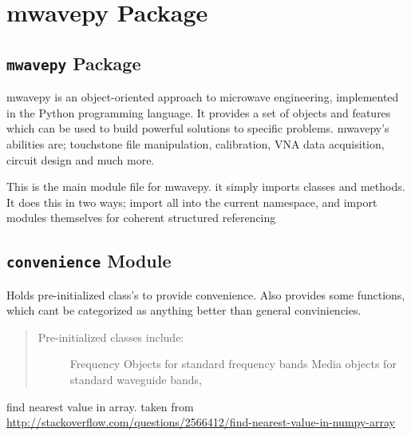 \documentclass[letterpaper,10pt,english]{sphinxmanual}
\begin{document}
\section{mwavepy Package}
\label{api/mwavepy:mwavepy-package}\label{api/mwavepy::doc}

\subsection{\texttt{mwavepy} Package}
\label{api/mwavepy:id1}\label{api/mwavepy:module-mwavepy.__init__}
mwavepy is an object-oriented approach to microwave engineering, 
implemented in the Python programming language. It provides a set of 
objects and features which can be used to build powerful solutions to 
specific problems. mwavepy's abilities are; touchstone file manipulation,
calibration, VNA data acquisition, circuit design and much more.

This is the main module file for mwavepy. it simply imports classes and
methods. It does this in two ways; import all into the current namespace,
and import modules themselves for coherent  structured referencing


\subsection{\texttt{convenience} Module}
\label{api/mwavepy:convenience-module}\label{api/mwavepy:module-mwavepy.convenience}
Holds pre-initialized  class's to provide convenience. Also provides
some functions, which cant be categorized as anything better than 
general conviniencies.
\begin{quote}
\begin{description}
\item[{Pre-initialized classes include:}] \leavevmode
Frequency Objects for standard frequency bands
Media objects for standard waveguide bands,

\end{description}
\end{quote}

\begin{fulllineitems}
\label{api/mwavepy:mwavepy.convenience.find_nearest}
find nearest value in array.
taken from  \href{http://stackoverflow.com/questions/2566412/find-nearest-value-in-numpy-array}{http://stackoverflow.com/questions/2566412/find-nearest-value-in-numpy-array}

\end{fulllineitems}
\end{document}
